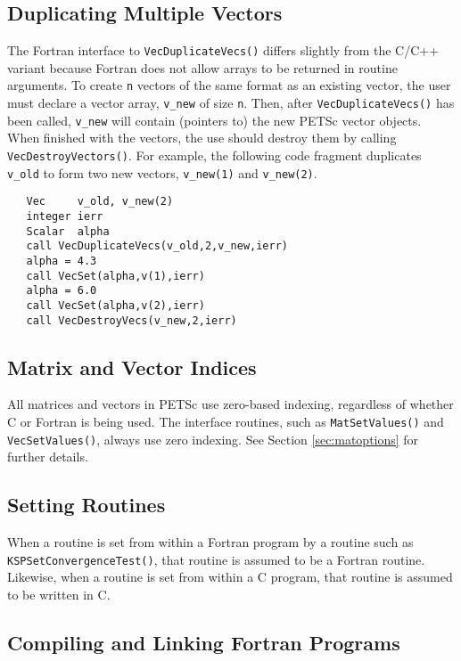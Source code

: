 \subsection{Duplicating Multiple Vectors}
\label{sec:fortvecd}

The Fortran interface to {\tt VecDuplicateVecs()} differs slightly
from the C/C++ variant because Fortran does not allow arrays to be
returned in routine arguments.  To create {\tt n} vectors of the same
format as an existing vector, the user must declare a vector array,
{\tt v\_new} of size {\tt n}.  Then, after {\tt VecDuplicateVecs()} has
been called, {\tt v\_new} will contain (pointers to) the new PETSc
vector objects.  When finished with the vectors, the use should
destroy them by calling {\tt VecDestroyVectors()}.
 For example, the following code fragment
duplicates {\tt v\_old} to form two new vectors, {\tt v\_new(1)} and {\tt v\_new(2)}.
\begin{verbatim}
   Vec     v_old, v_new(2)
   integer ierr
   Scalar  alpha
   call VecDuplicateVecs(v_old,2,v_new,ierr)
   alpha = 4.3
   call VecSet(alpha,v(1),ierr)
   alpha = 6.0
   call VecSet(alpha,v(2),ierr)
   call VecDestroyVecs(v_new,2,ierr)
\end{verbatim}

\subsection{Matrix and Vector Indices}

All matrices and vectors in PETSc use zero-based indexing, regardless
of whether C or Fortran is being used.  The interface routines, such
as {\tt MatSetValues()} and {\tt VecSetValues()}, always use zero
indexing.  See Section \ref{sec:matoptions} for further details.

\subsection{Setting Routines}

When a routine is set from within a Fortran program by a routine such
as {\tt KSPSetConvergenceTest()}, that routine is assumed to be a
Fortran routine. Likewise, when a routine is set from within a C
program, that routine is assumed to be written in C.

\subsection{Compiling and Linking Fortran Programs}
\label{sec:fortcompile}

